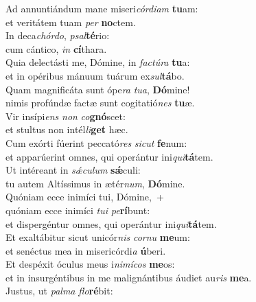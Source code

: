 \evenverse Ad annuntiándum mane miseri\textit{cór}\textit{di}\textit{am} \textbf{tu}am:~\*\\
\evenverse et veritátem tuam \textit{per} \textbf{no}ctem.\\
\oddverse In deca\textit{chór}\textit{do}, \textit{psal}\textbf{té}rio:~\*\\
\oddverse cum cántico, \textit{in} \textbf{cí}thara.\\
\evenverse Quia delectásti me, Dómine, in \textit{fa}\textit{ctú}\textit{ra} \textbf{tu}a:~\*\\
\evenverse et in opéribus mánuum tuárum ex\textit{sul}\textbf{tá}bo.\\
\oddverse Quam magnificáta sunt ópe\textit{ra} \textit{tu}\textit{a}, \textbf{Dó}mine!~\*\\
\oddverse nimis profúndæ factæ sunt cogitatió\textit{nes} \textbf{tu}æ.\\
\evenverse Vir insípi\textit{ens} \textit{non} \textit{co}\textbf{gnó}scet:~\*\\
\evenverse et stultus non intél\textit{li}\textbf{get} hæc.\\
\oddverse Cum exórti fúerint peccató\textit{res} \textit{si}\textit{cut} \textbf{fe}num:~\*\\
\oddverse et apparúerint omnes, qui operántur ini\textit{qui}\textbf{tá}tem.\\
\evenverse Ut intéreant in \textit{sǽ}\textit{cu}\textit{lum} \textbf{sǽ}culi:~\*\\
\evenverse tu autem Altíssimus in ætér\textit{num}, \textbf{Dó}mine.\\
\oddverse Quóniam ecce inimíci tui, Dómine,~+\\
\oddverse  quóniam ecce inimíci \textit{tu}\textit{i} \textit{pe}\textbf{rí}bunt:~\*\\
\oddverse et dispergéntur omnes, qui operántur ini\textit{qui}\textbf{tá}tem.\\
\evenverse Et exaltábitur sicut unicór\textit{nis} \textit{cor}\textit{nu} \textbf{me}um:~\*\\
\evenverse et senéctus mea in misericórdi\textit{a} \textbf{ú}beri.\\
\oddverse Et despéxit óculus meus i\textit{ni}\textit{mí}\textit{cos} \textbf{me}os:~\*\\
\oddverse et in insurgéntibus in me malignántibus áudiet au\textit{ris} \textbf{me}a.\\
\evenverse Justus, ut \textit{pal}\textit{ma} \textit{flo}\textbf{ré}bit:~\*\\
